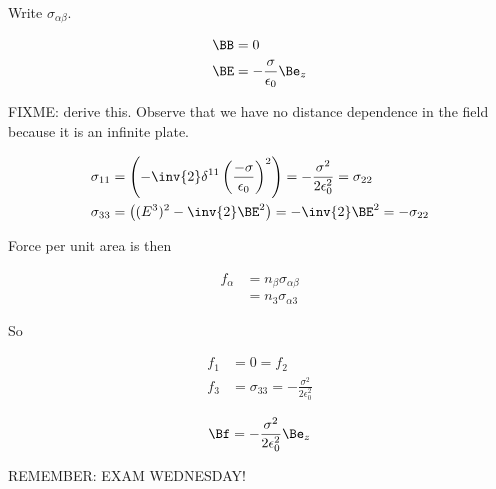 Write $\sigma_{\alpha\beta}$.

\begin{align}\label{eqn:relativisticElectrodynamicsT9:350}
\BB &= 0  \\
\BE &= - \frac{\sigma}{\epsilon_0} \Be_z
\end{align}

FIXME: derive this.  Observe that we have no distance dependence in the field because it is an infinite plate.

\begin{align}\label{eqn:relativisticElectrodynamicsT9:370}
\sigma_{1 1} &= \left( - \inv{2} \delta^{1 1} \left( \frac{-\sigma}{\epsilon_0} \right)^2 \right) = - \frac{ \sigma^2}{ 2 \epsilon_0^2 } = \sigma_{22} \\
\sigma_{3 3} &= \left( (E^3)^2 - \inv{2} \BE^2 \right)  = - \inv{2} \BE^2 = - \sigma_{2 2}
\end{align}

Force per unit area is then

\begin{align*}
f_\alpha 
&= n_\beta \sigma_{\alpha \beta} \\
&= n_3 \sigma_{\alpha 3}
\end{align*}

So 

\begin{align}\label{eqn:relativisticElectrodynamicsT9:390}
f_1 &= 0 = f_2 \\
f_3 &= \sigma_{3 3} = -\frac{\sigma^2}{2 \epsilon_0^2}
\end{align}

\begin{equation}\label{eqn:relativisticElectrodynamicsT9:410}
\Bf = -\frac{\sigma^2}{2 \epsilon_0^2} \Be_z
\end{equation}

REMEMBER: EXAM WEDNESDAY!

\EndArticle
